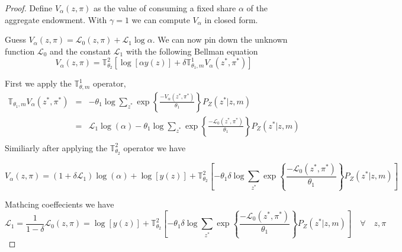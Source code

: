 \documentclass[12pt]{article}
\begin{document}
\begin{proof}

\noindent Define $V_{\alpha}(z,\pi)$ as the value of consuming a fixed share $\alpha$ of the aggregate endowment. With $\gamma=1$ we can compute $V_{\alpha}$ in closed form. 

\noindent Guess $V_{\alpha}(z,\pi) = \mathcal{L}_0(z,\pi)+\mathcal{L}_1 \log{ \alpha}$. We can now pin down the unknown function $\mathcal{L}_0$ and the constant $\mathcal{L}_1$ with the following Bellman equation
\begin{equation}
V_{\alpha}(z,\pi)=\mathbb{T}^2_{\theta_2}\left[\log[\alpha y(z)]+\delta \mathbb{T}^1_{\theta_1,m} V_{\alpha}(z^*,\pi^*)\right]
\end{equation}

First we apply the $\mathbb{T}^1_{\theta,m}$ operator,
\begin{align*}
\mathbb{T}_{\theta_1,m} V_{\alpha}(z^*,\pi^*)&=& -\theta_1 \log \sum_{z^*}{\exp\left\{ \frac{-V_{\alpha}(z^*,\pi^*)}{\theta_1}\right\}P_Z(z^*|z,m)} \\
&=& \mathcal{L}_1 \log(\alpha) -\theta_1 \log \sum_{z^*}{\exp\left\{ \frac{-\mathcal{L}_0(z^*,\pi^*)}{\theta_1}\right\}P_Z(z^*|z,m)} \\
\end{align*}
\noindent  Similiarly after applying the $\mathbb{T}^2_{\theta_2}$ operator we have

\begin{equation}
V_{\alpha}(z,\pi)=(1+\delta \mathcal{L}_1)\log(\alpha)+ \log[y(z)] + \mathbb{T}^2_{\theta_2} \left[-\theta_1 \delta \log \sum_{z^*}{\exp\left\{ \frac{-\mathcal{L}_0(z^*,\pi^*)}{\theta_1}\right\}P_Z(z^*|z,m)}\right]
\end{equation}

\noindent Mathcing coeffecients we have
\begin{subequations}
\begin{equation}
\mathcal{L}_1 =\frac{1}{1-\delta}
\end{equation}

\begin{equation}
\mathcal{L}_0(z,\pi) = \log[y(z)] + \mathbb{T}^2_{\theta_2} \left[-\theta_1 \delta \log \sum_{z^*}{\exp\left\{ \frac{-\mathcal{L}_0(z^*,\pi^*)}{\theta_1}\right\}P_Z(z^*|z,m)}\right] \quad \forall \quad z,\pi
\end{equation}
\end{subequations}


\end{proof}
\end{document}
